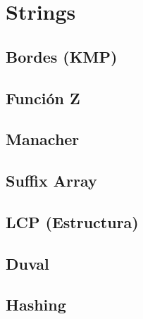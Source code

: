 \section{Strings}

\subsection{Bordes (KMP)}

\subsection{Función Z}

\subsection{Manacher}

\subsection{Suffix Array}

\subsection{LCP (Estructura)}

\subsection{Duval}

\subsection{Hashing}
